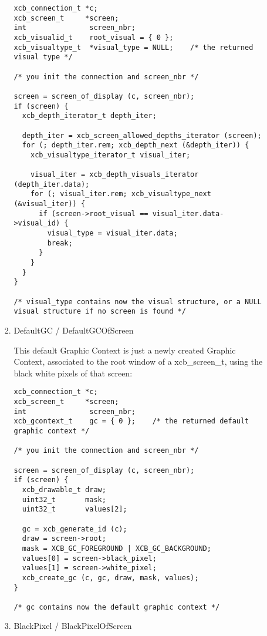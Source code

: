 \documentclass[12pt,oneside,titlepage]{book}
\begin{document}
\begin{enumerate}
\begin{enumerate}
\begin{enumerate}
\begin{verbatim}
xcb_connection_t *c;
xcb_screen_t     *screen;
int               screen_nbr;
xcb_visualid_t    root_visual = { 0 };
xcb_visualtype_t  *visual_type = NULL;    /* the returned visual type */

/* you init the connection and screen_nbr */

screen = screen_of_display (c, screen_nbr);
if (screen) {
  xcb_depth_iterator_t depth_iter;

  depth_iter = xcb_screen_allowed_depths_iterator (screen);
  for (; depth_iter.rem; xcb_depth_next (&depth_iter)) {
    xcb_visualtype_iterator_t visual_iter;

    visual_iter = xcb_depth_visuals_iterator (depth_iter.data);
    for (; visual_iter.rem; xcb_visualtype_next (&visual_iter)) {
      if (screen->root_visual == visual_iter.data->visual_id) {
        visual_type = visual_iter.data;
        break;
      }
    }
  }
}

/* visual_type contains now the visual structure, or a NULL visual structure if no screen is found */
\end{verbatim}
    \item
      \protect\hypertarget{DefaultGC}{}{DefaultGC / DefaultGCOfScreen}

      This default Graphic Context is just a newly created Graphic
      Context, associated to the root window of a {xcb\_screen\_t},
      using the black white pixels of that screen:

\begin{verbatim}
xcb_connection_t *c;
xcb_screen_t     *screen;
int               screen_nbr;
xcb_gcontext_t    gc = { 0 };    /* the returned default graphic context */

/* you init the connection and screen_nbr */

screen = screen_of_display (c, screen_nbr);
if (screen) {
  xcb_drawable_t draw;
  uint32_t       mask;
  uint32_t       values[2];

  gc = xcb_generate_id (c);
  draw = screen->root;
  mask = XCB_GC_FOREGROUND | XCB_GC_BACKGROUND;
  values[0] = screen->black_pixel;
  values[1] = screen->white_pixel;
  xcb_create_gc (c, gc, draw, mask, values);
}

/* gc contains now the default graphic context */
\end{verbatim}
    \item
      \protect\hypertarget{BlackPixel}{}{BlackPixel /
      BlackPixelOfScreen}


\end{enumerate}
\end{enumerate}
\end{enumerate}
\end{document}
